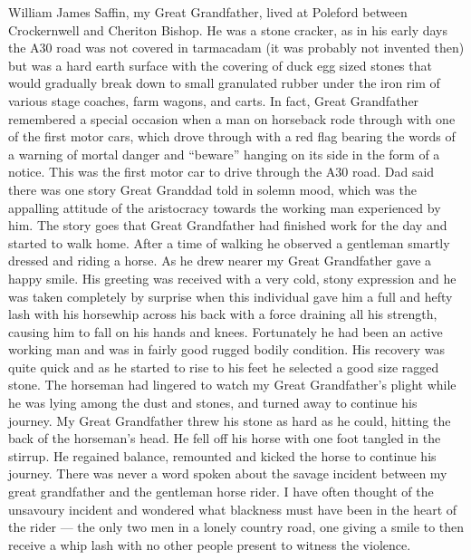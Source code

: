William James Saffin, my Great Grandfather, lived at Poleford between
Crockernwell and Cheriton Bishop. He was a stone cracker, as in his early days
the A30 road was not covered in tarmacadam (it was probably not invented then)
but was a hard earth surface with the covering of duck egg sized stones that
would gradually break down to small granulated rubber under the iron rim of
various stage coaches, farm wagons, and carts. In fact, Great Grandfather
remembered a special occasion when a man on horseback rode through with one of
the first motor cars, which drove through with a red flag bearing the words of
a warning of mortal danger and ``beware'' hanging on its side in the form of a
notice. This was the first motor car to drive through the A30 road. Dad said
there was one story Great Granddad told in solemn mood, which was the appalling
attitude of the aristocracy towards the working man experienced by him. The
story goes that Great Grandfather had finished work for the day and started to
walk home. After a time of walking he observed a gentleman smartly dressed and
riding a horse. As he drew nearer my Great Grandfather gave a happy smile. His
greeting was received with a very cold, stony expression and he was taken
completely by surprise when this individual gave him a full and hefty lash with
his horsewhip across his back with a force draining all his strength, causing
him to fall on his hands and knees. Fortunately he had been an active working
man and was in fairly good rugged bodily condition. His recovery was quite
quick and as he started to rise to his feet he selected a good size ragged
stone. The horseman had lingered to watch my Great Grandfather's plight while
he was lying among the dust and stones, and turned away to continue his
journey. My Great Grandfather threw his stone as hard as he could, hitting the
back of the horseman's head. He fell off his horse with one foot tangled in the
stirrup. He regained balance, remounted and kicked the horse to continue his
journey. There was never a word spoken about the savage incident between my
great grandfather and the gentleman horse rider. I have often thought of the
unsavoury incident and wondered what blackness must have been in the heart of
the rider --- the only two men in a lonely country road, one giving a smile to
then receive a whip lash with no other people present to witness the violence.


